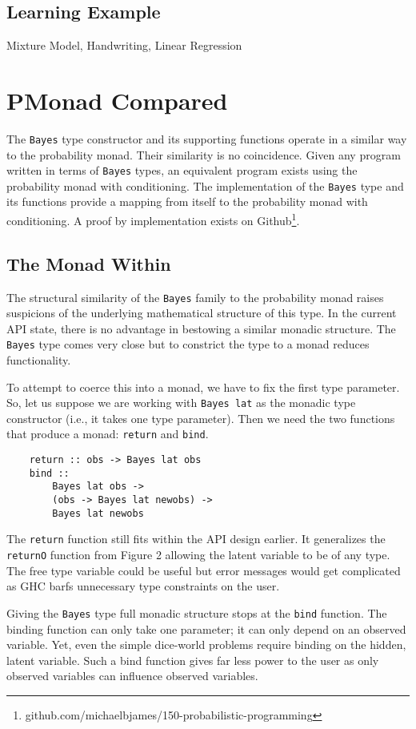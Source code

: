 \documentclass[10pt,twocolumn]{article}
\begin{document}
\subsection{Learning Example}
Mixture Model, Handwriting, Linear Regression

\section{PMonad Compared}
The \texttt{Bayes} type constructor and its supporting functions operate in a similar way to the probability monad. Their similarity is no coincidence. Given any program written in terms of \texttt{Bayes} types, an equivalent program exists using the probability monad with conditioning. The implementation of the \texttt{Bayes} type and its functions provide a mapping from itself to the probability monad with conditioning. A proof by implementation exists on Github\footnote{github.com/michaelbjames/150-probabilistic-programming}.

\subsection{The Monad Within}
The structural similarity of the \texttt{Bayes} family to the probability monad raises suspicions of the underlying mathematical structure of this type. In the current API state, there is no advantage in bestowing a similar monadic structure. The \texttt{Bayes} type comes very close but to constrict the type to a monad reduces functionality.

To attempt to coerce this into a monad, we have to fix the first type parameter. So, let us suppose we are working with \texttt{Bayes lat} as the monadic type constructor (i.e., it takes one type parameter). Then we need the two functions that produce a monad: \texttt{return} and \texttt{bind}.
\begin{verbatim}
    return :: obs -> Bayes lat obs
    bind ::
        Bayes lat obs ->
        (obs -> Bayes lat newobs) ->
        Bayes lat newobs
\end{verbatim}
The \texttt{return} function still fits within the API design earlier. It generalizes the \texttt{returnO} function from Figure 2 allowing the latent variable to be of any type. The free type variable could be useful but error messages would get complicated as GHC barfs unnecessary type constraints on the user.

Giving the \texttt{Bayes} type full monadic structure stops at the \texttt{bind} function. The binding function can only take one parameter; it can only depend on an observed variable. Yet, even the simple dice-world problems require binding on the hidden, latent variable. Such a bind function gives far less power to the user as only observed variables can influence observed variables.
\end{document}
